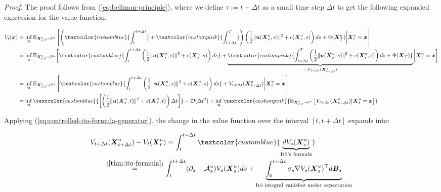 \documentclass{article}
\newcommand{\bluetext}[1]{\textcolor{customblue}{#1}}
\newcommand{\pinktext}[1]{\textcolor{custompink}{#1}}
\begin{document}
\textit{Proof.} The proof follows from (\ref{eq:bellman-principle}), where we define $\tau:=t+\Delta t$ as a small time step $\Delta t$ to get the following expanded expression for the value function:
\begin{small}
\begin{align}
    V_t(\boldsymbol{x})&=\inf_{\boldsymbol{u}}\mathbb{E}_{\boldsymbol{X}^u_{t:T}\sim \mathbb{P}^u}\left[\left(\bluetext{\int_t^{t+\Delta t}}+\pinktext{\int_{t+\Delta t}^T}\right)\left(\frac{1}{2}\|\boldsymbol{u}(\boldsymbol{X}^u_s,s)\|^2+c(\boldsymbol{X}^u_s,s)\right)ds+\Phi(\boldsymbol{X}^u_T)\bigg|\boldsymbol{X}^u_t=\boldsymbol{x}\right]\nonumber\\
    &= \inf_{\boldsymbol{u}}\mathbb{E}_{\boldsymbol{X}^u_{t:T}\sim \mathbb{P}^u}\bigg[\bluetext{\int_t^{t+\Delta t}\left(\frac{1}{2}\|\boldsymbol{u}(\boldsymbol{X}^u_s,s)\|^2+c(\boldsymbol{X}^u_s,s)\right)ds}+\underbrace{\pinktext{\int_{t+\Delta t}^T\left(\frac{1}{2}\|\boldsymbol{u}(\boldsymbol{X}^u_s,s)\|^2+c(\boldsymbol{X}^u_s,s)\right)ds+\Phi(\boldsymbol{X}_T)}}_{=:V_{t+\Delta t}(\boldsymbol{X}^u_{t+\Delta t})}\bigg|\boldsymbol{X}^u_t=\boldsymbol{x}\bigg]\nonumber\\
    &= \inf_{\boldsymbol{u}}\mathbb{E}_{\boldsymbol{X}^u_{t:T}\sim \mathbb{P}^u}\left[\bluetext{\int_t^{t+\Delta t}\left(\frac{1}{2}\|\boldsymbol{u}(\boldsymbol{X}^u_s,s)\|^2+c(\boldsymbol{X}^u_s,s)\right)ds}+V_{t+\Delta t}(\boldsymbol{X}^u_{t+\Delta t})\bigg|\boldsymbol{X}^u_t=\boldsymbol{x}\right]\nonumber\\
    &= \inf_{\boldsymbol{u}}\bluetext{\left[\left(\frac{1}{2}\|\boldsymbol{u}(\boldsymbol{X}^u_t,t)\|^2+c(\boldsymbol{X}^u_t,t)\right)\Delta t\right]}+\mathcal{O}(\Delta t^2)+\inf_{\boldsymbol{u}}\pinktext{\mathbb{E}_{\boldsymbol{X}^u_{t:T}\sim \mathbb{P}^u}\left[V_{t+\Delta t}(\boldsymbol{X}^u_{t+\Delta t})\big|\boldsymbol{X}^u_t=\boldsymbol{x}\right]}\label{eq:hjb-proof2}
\end{align}
\end{small}
Applying (\ref{eq:controlled-ito-formula-generator}), the change in the value function over the interval $[t, t+\Delta t]$ expands into:
\begin{small}
\begin{align}
    &V_{t+\Delta t}(\boldsymbol{X}^u_{t+\Delta t})-V_t(\boldsymbol{X}^u_t)=\int_t^{t+\Delta t}\bluetext{\underbrace{dV_s(\boldsymbol{X}^u_s)}_{\text{Itô's formula}}}\nonumber\\
    &\quad\quad\overset{(\ref{thm:ito-formula})}{=} \int_t^{t+\Delta t}(\partial_s+\mathcal{A}^u_s)V_s(\boldsymbol{X}^u_s)ds+\underbrace{\int_0^{t+\Delta t}\sigma_s\nabla V_s(\boldsymbol{X}^u_s)^\top d\boldsymbol{B}_s}_{\text{Itô integral vanishes under expectation}}
\end{align}
\end{small}
\end{document}
